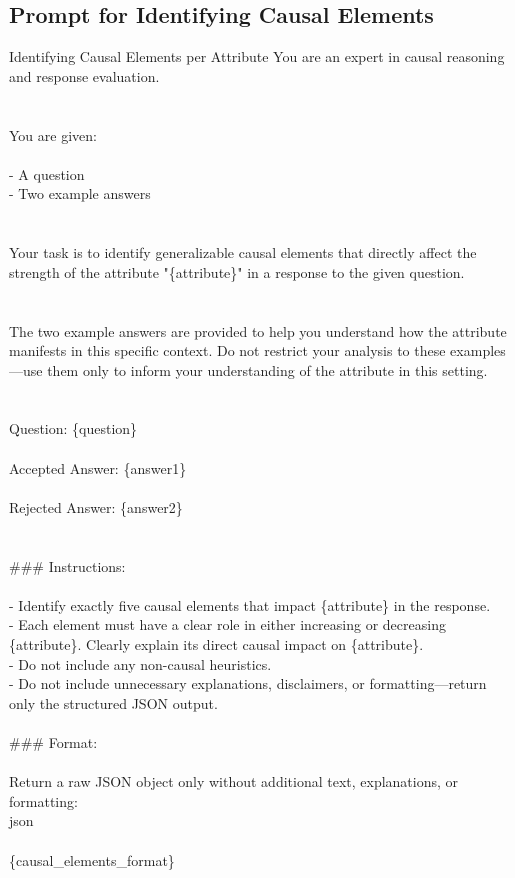 \subsection{Prompt for Identifying Causal Elements}
\vspace{-0.15in}
\begin{promptbox}{Identifying Causal Elements per Attribute}
You are an expert in causal reasoning and response evaluation.\\\\
\\
You are given:\\\\
- A question\\
- Two example answers\\\\
\\
Your task is to identify generalizable causal elements that directly affect the strength of the attribute "\{attribute\}" in a response to the given question.\\\\
\\
The two example answers are provided to help you understand how the attribute manifests in this specific context. Do not restrict your analysis to these examples—use them only to inform your understanding of the attribute in this setting.\\\\
\\
Question: \{question\}\\\\
Accepted Answer: \{answer1\}\\\\
Rejected Answer: \{answer2\}\\\\
\\
\#\#\# Instructions:\\\\
- Identify exactly five causal elements that impact \{attribute\} in the response.\\
- Each element must have a clear role in either increasing or decreasing \{attribute\}. Clearly explain its direct causal impact on \{attribute\}.\\
- Do not include any non-causal heuristics.\\
- Do not include unnecessary explanations, disclaimers, or formatting—return only the structured JSON output.\\
\\
\#\#\# Format:\\\\
Return a raw JSON object only without additional text, explanations, or formatting:\\
\textasciigrave\textasciigrave\textasciigrave json\\\\
\{causal\_elements\_format\}\\\\
\textasciigrave\textasciigrave\textasciigrave
\end{promptbox}

